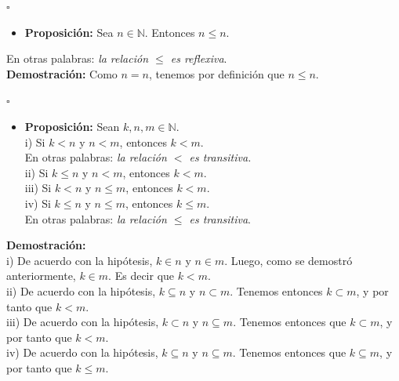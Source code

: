 \documentclass[10 pt]{article}
\begin{document}
\begin{flushright}
    $\square$
\end{flushright}

\begin{itemize}
    \item \Large{\textbf{Proposición:} Sea $n \in \mathbb N$. Entonces $n \leq n$.} \\
\end{itemize}

\Large{En otras palabras: \textit{la relación $\leq$ es reflexiva}.} \\

\Large{\textbf{Demostración:} Como $n=n$, tenemos por definición que $n \leq n$.} \\

\begin{flushright}
    $\square$
\end{flushright}

\begin{itemize}
    \item \Large{\textbf{Proposición:} Sean $k,n,m \in \mathbb N$. \\

    i) Si $k<n$ y $n<m$, entonces $k<m$. \\

    En otras palabras: \textit{la relación $<$ es transitiva.} \\

    ii) Si $k \leq n$ y $n<m$, entonces $k<m$. \\

    iii) Si $k<n$ y $n \leq m$, entonces $k<m$. \\

    iv) Si $k \leq n$ y $n \leq m$, entonces $k \leq m$. \\

    En otras palabras: \textit{la relación $\leq$ es transitiva}.} \\
\end{itemize}

\Large{\textbf{Demostración:} \\

i) De acuerdo con la hipótesis, $k \in n$ y $n \in m$. Luego, como se demostró anteriormente, $k \in m$. Es decir que $k<m$. \\

ii) De acuerdo con la hipótesis, $k \subseteq n$ y $n \subset m$. Tenemos entonces $k \subset m$, y por tanto que $k<m$. \\

iii) De acuerdo con la hipótesis, $k \subset n$ y $n \subseteq m$. Tenemos entonces que $k \subset m$, y por tanto que $k<m$. \\

iv) De acuerdo con la hipótesis, $k \subseteq n$ y $n \subseteq m$. Tenemos entonces que $k \subseteq m$, y por tanto que $k \leq m$.}\\
\end{document}
